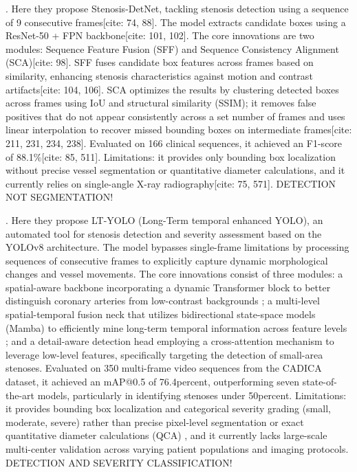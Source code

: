 \documentclass{article}
\begin{document}
\cite{PANG2021101900}. Here they propose Stenosis-DetNet, tackling stenosis detection using a sequence of 9 consecutive frames[cite: 74, 88]. The model extracts candidate boxes using a ResNet-50 + FPN backbone[cite: 101, 102]. The core innovations are two modules: Sequence Feature Fusion (SFF) and Sequence Consistency Alignment (SCA)[cite: 98]. SFF fuses candidate box features across frames based on similarity, enhancing stenosis characteristics against motion and contrast artifacts[cite: 104, 106]. SCA optimizes the results by clustering detected boxes across frames using IoU and structural similarity (SSIM); it removes false positives that do not appear consistently across a set number of frames and uses linear interpolation to recover missed bounding boxes on intermediate frames[cite: 211, 231, 234, 238]. Evaluated on 166 clinical sequences, it achieved an F1-score of 88.1\%[cite: 85, 511]. Limitations: it provides only bounding box localization without precise vessel segmentation or quantitative diameter calculations, and it currently relies on single-angle X-ray radiography[cite: 75, 571]. DETECTION NOT SEGMENTATION!

\cite{li2025ltyolo}. Here they propose LT-YOLO (Long-Term temporal enhanced YOLO), an automated tool for stenosis detection and severity assessment based on the YOLOv8 architecture. The model bypasses single-frame limitations by processing sequences of consecutive frames to explicitly capture dynamic morphological changes and vessel movements. The core innovations consist of three modules: a spatial-aware backbone incorporating a dynamic Transformer block to better distinguish coronary arteries from low-contrast backgrounds ; a multi-level spatial-temporal fusion neck that utilizes bidirectional state-space models (Mamba) to efficiently mine long-term temporal information across feature levels ; and a detail-aware detection head employing a cross-attention mechanism to leverage low-level features, specifically targeting the detection of small-area stenoses. Evaluated on 350 multi-frame video sequences from the CADICA dataset, it achieved an mAP@0.5 of 76.4percent, outperforming seven state-of-the-art models, particularly in identifying stenoses under 50percent. Limitations: it provides bounding box localization and categorical severity grading (small, moderate, severe) rather than precise pixel-level segmentation or exact quantitative diameter calculations (QCA) , and it currently lacks large-scale multi-center validation across varying patient populations and imaging protocols. DETECTION AND SEVERITY CLASSIFICATION!
\end{document}

